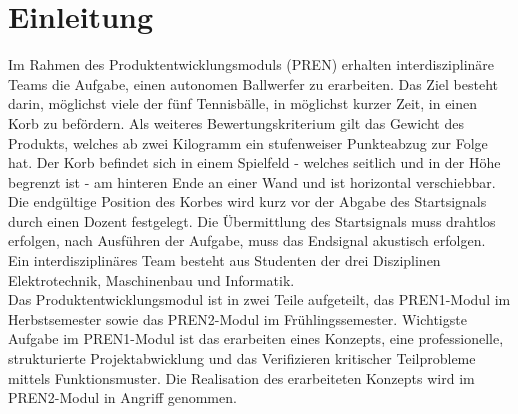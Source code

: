 \section{Einleitung}
Im Rahmen des Produktentwicklungsmoduls (PREN) erhalten interdisziplinäre Teams die Aufgabe, einen autonomen Ballwerfer zu erarbeiten. Das Ziel besteht darin, möglichst viele der fünf Tennisbälle, in möglichst kurzer Zeit, in einen Korb zu befördern. Als weiteres Bewertungskriterium gilt das Gewicht des Produkts, welches ab zwei Kilogramm ein stufenweiser Punkteabzug zur Folge hat. Der Korb befindet sich in einem Spielfeld - welches seitlich und in der Höhe begrenzt ist - am hinteren Ende an einer Wand und ist horizontal verschiebbar. Die endgültige Position des Korbes wird kurz vor der Abgabe des Startsignals durch einen Dozent festgelegt. Die Übermittlung des Startsignals muss drahtlos erfolgen, nach Ausführen der Aufgabe, muss das Endsignal akustisch erfolgen.\\

Ein interdisziplinäres Team besteht aus Studenten der drei Disziplinen Elektrotechnik, Maschinenbau und Informatik.\\

Das Produktentwicklungsmodul ist in zwei Teile aufgeteilt, das PREN1-Modul im Herbstsemester sowie das PREN2-Modul im Frühlingssemester. Wichtigste Aufgabe im PREN1-Modul ist das erarbeiten eines Konzepts, eine professionelle, strukturierte Projektabwicklung und das Verifizieren kritischer Teilprobleme mittels Funktionsmuster. Die Realisation des erarbeiteten Konzepts wird im PREN2-Modul in Angriff genommen. 

